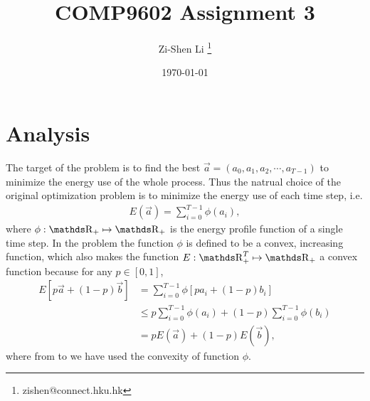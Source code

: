 \documentclass[letterpaper,10pt]{article}
\begin{document}
\title{COMP9602 Assignment 3}
\author[1]{Zi-Shen Li \thanks{zishen@connect.hku.hk}}
\date{\today}
\maketitle

\section{Analysis}\label{sec:analysis}

The target of the problem is to find the best $\vec a=(a_0,a_1,a_2,\cdots,a_{T-1})$ to minimize the energy use of the whole process.
Thus the natrual choice of the original optimization problem is to minimize the energy use of each time step, i.e.
\begin{align}
    E(\vec a)=\sum_{i=0}^{T-1} \phi(a_i),
\end{align}
where $\phi: \Reals_+ \mapsto \Reals_+$ is the energy profile function of a single time step.
In the problem the function $\phi$ is defined to be a convex, increasing function, which also makes the function $E: \Reals_+^T \mapsto \Reals_+$ a convex function because for any $p\in [0,1]$,
\begin{align}
    \label{eq:step1-cvxfunc}E\left[p\vec a+(1-p)\vec b\right] &= \sum_{i=0}^{T-1} \phi[p a_i+(1-p)b_i]\\
    \label{eq:step2-cvxfunc}&\le p\sum_{i=0}^{T-1} \phi(a_i)+(1-p)\sum_{i=0}^{T-1} \phi(b_i)\\
    &=p E(\vec a)+(1-p) E(\vec b),
\end{align}
where from  to  we have used the convexity of function $\phi$.
\end{document}
